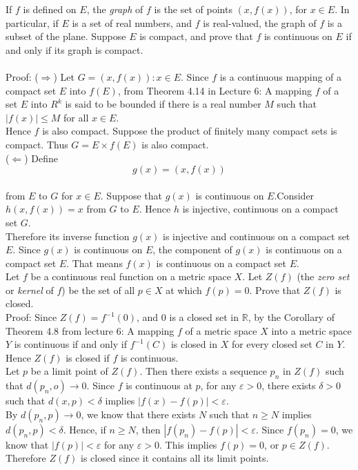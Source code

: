 \documentclass [12pt,letterpaper]{exam}
\begin{document}
\begin{questions}
\question If $f$ is defined on $E$, the {\em graph} of $f$ is the
set of points $(x,f(x))$, for $x \in E$. In particular, if $E$ is a
set of real numbers, and $f$ is real-valued, the graph of $f$ is a
subset of the plane. Suppose $E$ is compact, and prove that $f$ is
continuous on $E$ if and only if its graph is compact.
\\\\
Proof: ($\Rightarrow$) Let $G = {(x,f(x)):x \in E}$. Since $f$ is a continuous mapping of a compact set $E$ into $f(E)$, from Theorem 4.14 in Lecture 6: A mapping $f$ of a set $E$ into $R^k$ is said to be bounded if there is a real number $M$ such that $|f(x)| \leq M$ for all $x \in E$.\\
Hence $f$ is also compact. Suppose the product of finitely many compact sets is compact. Thus $G = E \times f(E)$ is also compact.\\
($\Leftarrow$) Define $$g(x) = (x,f(x))$$\\
from $E$ to $G$ for $x \in E$. Suppose that $g(x)$ is continuous on $E$.Consider $h(x,f(x)) = x$ from $G$ to $E$. Hence $h$ is injective, continuous on a compact set $G$. \\
Therefore its inverse function $g(x)$ is injective and continuous on a compact set $E$. Since $g(x)$ is continuous on $E$, the component of $g(x)$ is continuous on a compact set $E$. That means $f(x)$ is continuous on a compact set $E$.\\
 
\question Let $f$ be a continuous real function on a metric space
$X$. Let $Z(f)$ (the {\em zero set} or {\em kernel} of $f$) be the
set of all $p \in X$ at which $f(p)=0$. Prove that $Z(f)$ is closed.\\
Proof: Since $Z(f) = f^{-1}({0})$, and ${0}$ is a closed set in $\mathbb{R}$, by the Corollary of Theorem 4.8 from lecture 6: A mapping $f$ of a metric space $X$ into a metric space $Y$ is continuous if and only if $f^{-1}(C)$ is closed in $X$ for every closed set $C$ in $Y$.\\
Hence $Z(f)$ is closed if $f$ is continuous.\\
Let $p$ be a limit point of $Z(f)$. Then there exists a sequence ${p_n}$ in $Z(f)$ such that $d(p_n,o) \rightarrow 0$. Since $f$ is continuous at $p$, for any $\varepsilon > 0$, there exists $\delta > 0$ such that $d(x,p) < \delta$ implies $|f(x) - f(p)| < \varepsilon$.\\
By $d(p_n,p) \rightarrow 0$, we know that there exists $N$ such that $n \geq N$ implies $d(p_n,p) < \delta$. 
Hence, if $n \geq N$, then $|f(p_n) - f(p)| < \varepsilon$. Since $f(p_n) = 0$, we know that $|f(p)| < \varepsilon$ for any $\varepsilon > 0$. This implies $f(p) = 0$, or $p \in Z(f)$. \\
Therefore $Z(f)$ is closed since it contains all its limit points.\\

\end{questions}
\end{document}
